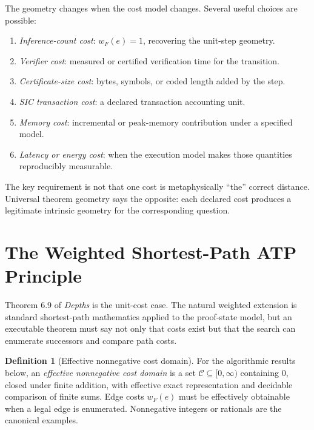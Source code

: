 \documentclass[11pt]{article}
\theoremstyle{definition}
\newtheorem{definition}[theorem]{Definition}
\theoremstyle{remark}
\begin{document}
The geometry changes when the cost model changes. Several useful choices are possible:
\begin{enumerate}[label=(\alph*)]
\item \emph{Inference-count cost}: $w_F(e)=1$, recovering the unit-step geometry.
\item \emph{Verifier cost}: measured or certified verification time for the transition.
\item \emph{Certificate-size cost}: bytes, symbols, or coded length added by the step.
\item \emph{SIC transaction cost}: a declared transaction accounting unit.
\item \emph{Memory cost}: incremental or peak-memory contribution under a specified model.
\item \emph{Latency or energy cost}: when the execution model makes those quantities reproducibly measurable.
\end{enumerate}
The key requirement is not that one cost is metaphysically ``the'' correct distance. Universal theorem geometry says the opposite: each declared cost produces a legitimate intrinsic geometry for the corresponding question.

\section{The Weighted Shortest-Path ATP Principle}

Theorem 6.9 of \emph{Depths} is the unit-cost case. The natural weighted extension is standard shortest-path mathematics applied to the proof-state model, but an executable theorem must say not only that costs exist but that the search can enumerate successors and compare path costs.

\begin{definition}[Effective nonnegative cost domain]\label{def:cost-domain}
For the algorithmic results below, an \emph{effective nonnegative cost domain} is a set $\mathcal C\subseteq[0,\infty)$ containing $0$, closed under finite addition, with effective exact representation and decidable comparison of finite sums. Edge costs $w_F(e)$ must be effectively obtainable when a legal edge is enumerated. Nonnegative integers or rationals are the canonical examples.
\end{definition}
\end{document}
